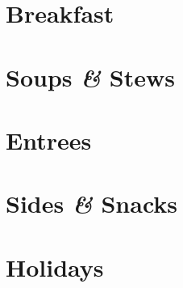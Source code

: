 \documentclass{article}
\begin{document}
\tableofcontents

% 
%
% 

\section{Breakfast}




\section{Soups \textit{\&} Stews}





\section{Entrees}



\section{Sides \textit{\&} Snacks}




\section{Holidays}






\end{document}
